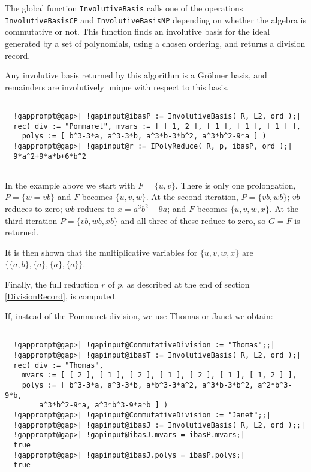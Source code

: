 \documentclass[a4paper,11pt]{report}
\begin{document}
{{{ The global function \texttt{InvolutiveBasis} calls one of the operations \texttt{InvolutiveBasisCP} and \texttt{InvolutiveBasisNP} depending on whether the algebra is commutative or not. This function finds an
involutive basis for the ideal generated by a set of polynomials, using a
chosen ordering, and returns a division record. 

 Any involutive basis returned by this algorithm is a Gr{\"o}bner basis, and
remainders are involutively unique with respect to this basis. 

 }

 
\begin{Verbatim}[commandchars=!@|,fontsize=\small,frame=single,label=Example]
  
  !gapprompt@gap>| !gapinput@ibasP := InvolutiveBasis( R, L2, ord );|
  rec( div := "Pommaret", mvars := [ [ 1, 2 ], [ 1 ], [ 1 ], [ 1 ] ], 
    polys := [ b^3-3*a, a^3-3*b, a^3*b-3*b^2, a^3*b^2-9*a ] )
  !gapprompt@gap>| !gapinput@r := IPolyReduce( R, p, ibasP, ord );|
  9*a^2+9*a*b+6*b^2
  
\end{Verbatim}
 In the example above we start with $F=\{u,v\}$. There is only one prolongation, $P=\{w=vb\}$ and $F$ becomes $\{u,v,w\}$. At the second iteration, $P=\{vb,wb\}$; $vb$ reduces to zero; $wb$ reduces to $x=a^3b^2-9a$; and $F$ becomes $\{u,v,w,x\}$. At the third iteration $P=\{vb,wb,xb\}$ and all three of these reduce to zero, so $G = F$ is returned. 

 It is then shown that the multiplicative variables for $\{u,v,w,x\}$ are $\{\{a,b\},\{a\},\{a\},\{a\}\}$. 

 Finally, the full reduction $r$ of $p$, as described at the end of section \ref{DivisionRecord}, is computed. 

 If, instead of the Pommaret division, we use Thomas or Janet we obtain: 
\begin{Verbatim}[commandchars=!@|,fontsize=\small,frame=single,label=Example]
  
  !gapprompt@gap>| !gapinput@CommutativeDivision := "Thomas";;|
  !gapprompt@gap>| !gapinput@ibasT := InvolutiveBasis( R, L2, ord );|
  rec( div := "Thomas", 
    mvars := [ [ 2 ], [ 1 ], [ 2 ], [ 1 ], [ 2 ], [ 1 ], [ 1, 2 ] ], 
    polys := [ b^3-3*a, a^3-3*b, a*b^3-3*a^2, a^3*b-3*b^2, a^2*b^3-9*b, 
        a^3*b^2-9*a, a^3*b^3-9*a*b ] )
  !gapprompt@gap>| !gapinput@CommutativeDivision := "Janet";;|
  !gapprompt@gap>| !gapinput@ibasJ := InvolutiveBasis( R, L2, ord );;|
  !gapprompt@gap>| !gapinput@ibasJ.mvars = ibasP.mvars;|
  true
  !gapprompt@gap>| !gapinput@ibasJ.polys = ibasP.polys;|
  true
  

\end{Verbatim}}}
\end{document}

